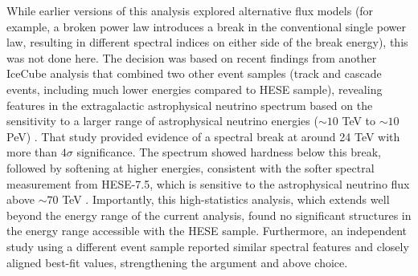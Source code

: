 While earlier versions of this analysis explored alternative flux models (for example, a broken power law introduces a break in the conventional single power law, resulting in different spectral indices on either side of the break energy), this was not done here. The decision was based on recent findings from another IceCube analysis that combined two other event samples (track and cascade events, including much lower energies compared to HESE sample), revealing features in the extragalactic astrophysical neutrino spectrum based on the sensitivity to a larger range of astrophysical neutrino energies ($\sim10$ TeV to $\sim10$ PeV) . That study provided evidence of a spectral break at around 24 TeV with more than $4\sigma$ significance. The spectrum showed hardness below this break, followed by softening at higher energies, consistent with the softer spectral measurement from HESE-7.5, which is sensitive to the astrophysical neutrino flux above $\sim 70$ TeV . Importantly, this high-statistics analysis, which extends well beyond the energy range of the current analysis, found no significant structures in the energy range accessible with the HESE sample. Furthermore, an independent study using a different event sample  reported similar spectral features and closely aligned best-fit values, strengthening the argument and above choice. 


